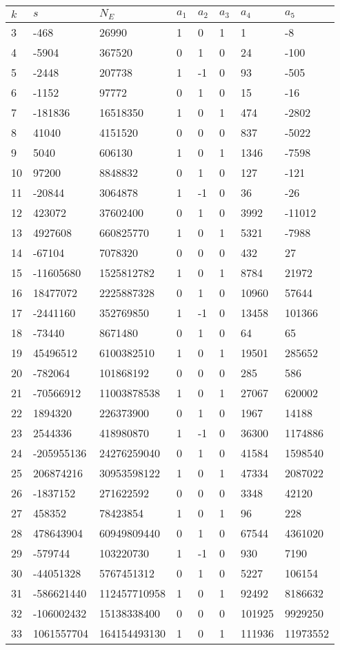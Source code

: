 \documentclass{amsart}
\begin{document}
\begin{longtable}{|l|l|l|lllll|}
\hline
$k$ & $s$ & $N_E$ & $a_1$ & $a_2$ & $a_3$ & $a_4$ & $a_5$\\
\hline
3&-468&26990&1&0&1&1&-8\\
4&-5904&367520&0&1&0&24&-100\\
5&-2448&207738&1&-1&0&93&-505\\
6&-1152&97772&0&1&0&15&-16\\
7&-181836&16518350&1&0&1&474&-2802\\
8&41040&4151520&0&0&0&837&-5022\\
9&5040&606130&1&0&1&1346&-7598\\
10&97200&8848832&0&1&0&127&-121\\
11&-20844&3064878&1&-1&0&36&-26\\
12&423072&37602400&0&1&0&3992&-11012\\
13&4927608&660825770&1&0&1&5321&-7988\\
14&-67104&7078320&0&0&0&432&27\\
15&-11605680&1525812782&1&0&1&8784&21972\\
16&18477072&2225887328&0&1&0&10960&57644\\
17&-2441160&352769850&1&-1&0&13458&101366\\
18&-73440&8671480&0&1&0&64&65\\
19&45496512&6100382510&1&0&1&19501&285652\\
20&-782064&101868192&0&0&0&285&586\\
21&-70566912&11003878538&1&0&1&27067&620002\\
22&1894320&226373900&0&1&0&1967&14188\\
23&2544336&418980870&1&-1&0&36300&1174886\\
24&-205955136&24276259040&0&1&0&41584&1598540\\
25&206874216&30953598122&1&0&1&47334&2087022\\
26&-1837152&271622592&0&0&0&3348&42120\\
27&458352&78423854&1&0&1&96&228\\
28&478643904&60949809440&0&1&0&67544&4361020\\
29&-579744&103220730&1&-1&0&930&7190\\
30&-44051328&5767451312&0&1&0&5227&106154\\
31&-586621440&112457710958&1&0&1&92492&8186632\\
32&-106002432&15138338400&0&0&0&101925&9929250\\
33&1061557704&164154493130&1&0&1&111936&11973552\\

\end{longtable}
\end{document}
